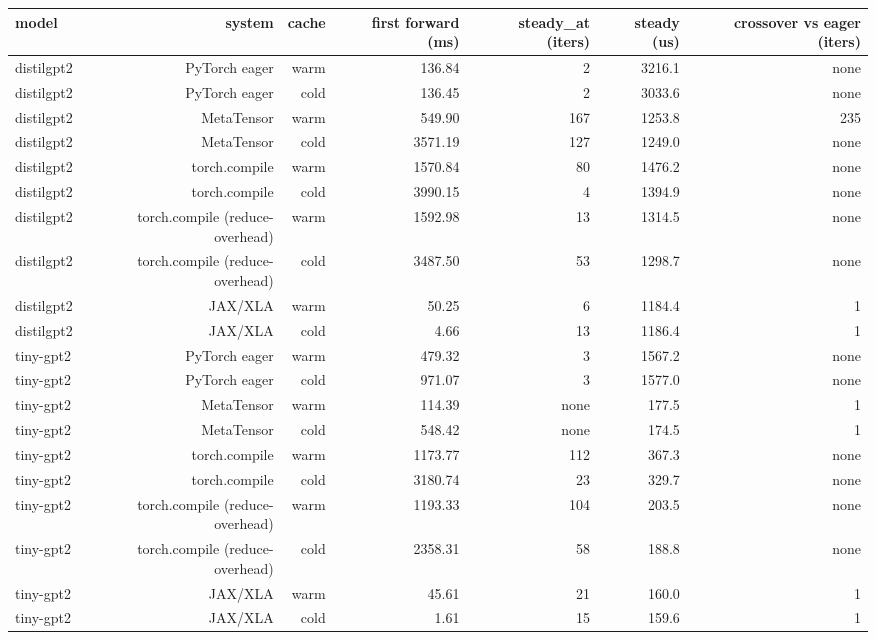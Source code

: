 \begin{tabular}{lrrrrrr}
\toprule
model & system & cache & first forward (ms) & steady\_at (iters) & steady (us) & crossover vs eager (iters) \\
\midrule
distilgpt2 & PyTorch eager & warm & 136.84 & 2 & 3216.1 & none \\
distilgpt2 & PyTorch eager & cold & 136.45 & 2 & 3033.6 & none \\
distilgpt2 & MetaTensor & warm & 549.90 & 167 & 1253.8 & 235 \\
distilgpt2 & MetaTensor & cold & 3571.19 & 127 & 1249.0 & none \\
distilgpt2 & torch.compile & warm & 1570.84 & 80 & 1476.2 & none \\
distilgpt2 & torch.compile & cold & 3990.15 & 4 & 1394.9 & none \\
distilgpt2 & torch.compile (reduce-overhead) & warm & 1592.98 & 13 & 1314.5 & none \\
distilgpt2 & torch.compile (reduce-overhead) & cold & 3487.50 & 53 & 1298.7 & none \\
distilgpt2 & JAX/XLA & warm & 50.25 & 6 & 1184.4 & 1 \\
distilgpt2 & JAX/XLA & cold & 4.66 & 13 & 1186.4 & 1 \\
tiny-gpt2 & PyTorch eager & warm & 479.32 & 3 & 1567.2 & none \\
tiny-gpt2 & PyTorch eager & cold & 971.07 & 3 & 1577.0 & none \\
tiny-gpt2 & MetaTensor & warm & 114.39 & none & 177.5 & 1 \\
tiny-gpt2 & MetaTensor & cold & 548.42 & none & 174.5 & 1 \\
tiny-gpt2 & torch.compile & warm & 1173.77 & 112 & 367.3 & none \\
tiny-gpt2 & torch.compile & cold & 3180.74 & 23 & 329.7 & none \\
tiny-gpt2 & torch.compile (reduce-overhead) & warm & 1193.33 & 104 & 203.5 & none \\
tiny-gpt2 & torch.compile (reduce-overhead) & cold & 2358.31 & 58 & 188.8 & none \\
tiny-gpt2 & JAX/XLA & warm & 45.61 & 21 & 160.0 & 1 \\
tiny-gpt2 & JAX/XLA & cold & 1.61 & 15 & 159.6 & 1 \\
\bottomrule
\end{tabular}
